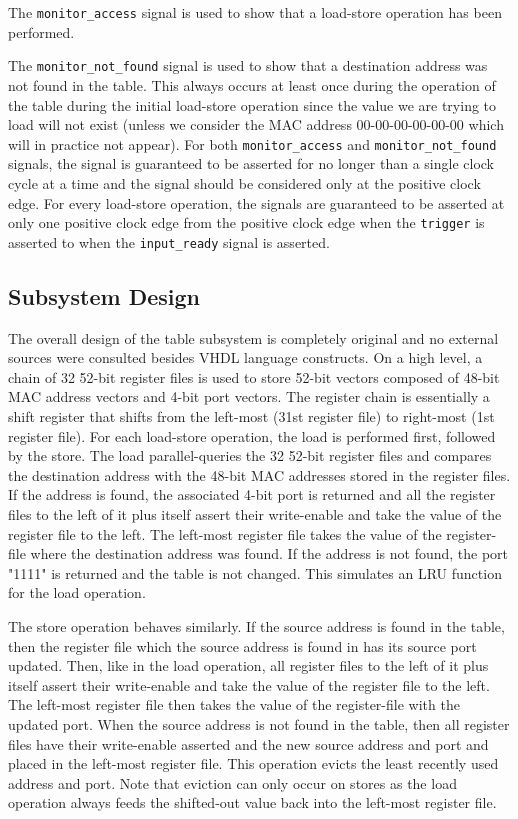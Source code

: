 \documentclass{article}
\begin{document}
The \texttt{monitor\_access} signal is used to show that a load-store operation has been performed. 

The \texttt{monitor\_not\_found} signal is used to show that a destination address was not found in the table. This always occurs at least once during the operation of the table during the initial load-store operation since the value we are trying to load will not exist (unless we consider the MAC address 00-00-00-00-00-00 which will in practice not appear). For both \texttt{monitor\_access} and \texttt{monitor\_not\_found} signals, the signal is guaranteed to be asserted for no longer than a single clock cycle at a time and the signal should be considered only at the positive clock edge. For every load-store operation, the signals are guaranteed to be asserted at only one positive clock edge from the positive clock edge when the \texttt{trigger} is asserted to when the \texttt{input\_ready} signal is asserted.

\newpage
\subsection{Subsystem Design}

The overall design of the table subsystem is completely original and no external sources were consulted besides VHDL language constructs. On a high level, a chain of 32 52-bit register files is used to store 52-bit vectors composed of 48-bit MAC address vectors and 4-bit port vectors. The register chain is essentially a shift register that shifts from the left-most (31st register file) to right-most (1st register file). For each load-store operation, the load is performed first, followed by the store. The load parallel-queries the 32 52-bit register files and compares the destination address with the 48-bit MAC addresses stored in the register files. If the address is found, the associated 4-bit port is returned and all the register files to the left of it plus itself assert their write-enable and take the value of the register file to the left. The left-most register file takes the value of the register-file where the destination address was found. If the address is not found, the port "1111" is returned and the table is not changed. This simulates an LRU function for the load operation. 

The store operation behaves similarly. If the source address is found in the table, then the register file which the source address is found in has its source port updated. Then, like in the load operation, all register files to the left of it plus itself assert their write-enable and take the value of the register file to the left. The left-most register file then takes the value of the register-file with the updated port. When the source address is not found in the table, then all register files have their write-enable asserted and the new source address and port and placed in the left-most register file. This operation evicts the least recently used address and port. Note that eviction can only occur on stores as the load operation always feeds the shifted-out value back into the left-most register file.
\end{document}
